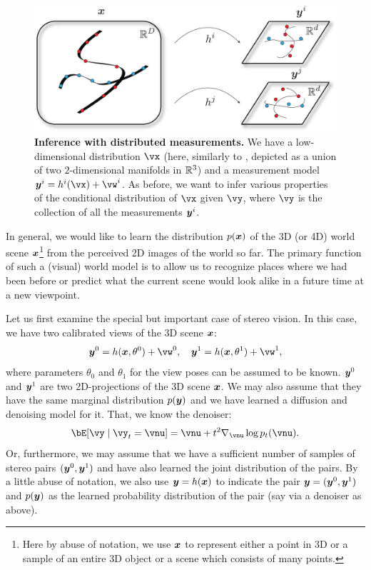 \documentclass[../../book-main.tex]{subfiles}
\begin{document}
\begin{figure}[t]
  \centering 
  \includegraphics[width=0.7\linewidth]{figs_chap6/inference_distributed.pdf}
  \caption{\small \textbf{Inference with distributed measurements.} We have a low-dimensional distribution \(\vx\) (here, similarly to , depicted as a union of two \(2\)-dimensional manifolds in \(\mathbb{R}^{3}\)) and a measurement model \(\y^{i} = h^{i}(\vx) + \vw^{i}\). As before, we want to infer various properties of the conditional distribution of \(\vx\) given \(\vy\), where \(\vy\) is the collection of all the measurements \(\bm{y}^{i}\).}
  \label{fig:inference_distributed}
\end{figure}

In general, we would like to learn the distribution $p(\bm{x})$ of the 3D (or 4D) world scene $\bm{x}$\footnote{Here by abuse of notation, we use $\bm{x}$ to represent either a point in 3D or a sample of an entire 3D object or a scene which consists of many points.} from the perceived 2D images of the world so far. The primary function of such a (visual) world model is to allow us to recognize places where we had been before or predict what the current scene would look alike in a future time at a new viewpoint. 

Let us first examine the special but important case of stereo vision. In this case, we have two calibrated views of the 3D scene $\bm{x}$:
\begin{equation}
    \y^0 = h(\x, \theta^0) +\vw^0, \quad \y^1 = h(\x, \theta^1) +\vw^1, 
\end{equation}
where parameters $\theta_0$ and $\theta_1$ for the view poses can be assumed to be known. $\bm{y}^0$ and $\bm{y}^1$ are two 2D-projections of the 3D scene $\bm{x}$. We may also assume that they have the same marginal distribution $p(\bm{y})$ and we have learned a diffusion and denoising model for it. That, we know the denoiser:
\begin{equation}
  \bE[\vy \mid \vy_t=\vnu] =
  \vnu + t^2 \nabla_{\vnu}\log p_t(\vnu). 
 \label{eq:y-posterior-sampling-denoiser}    
\end{equation}
Or, furthermore, we may assume that we have a sufficient number of samples of stereo pairs $(\bm{y}^0, \bm{y}^1)$ and have also learned the joint distribution of the pairs. By a little abuse of notation, we also use $\bm{y} = h(\bm{x})$ to indicate the pair $\bm{y} = (\bm{y}^0, \bm{y}^1)$ and $p(\bm{y})$ as the learned probability distribution of the pair (say via a denoiser as above).  
\end{document}
